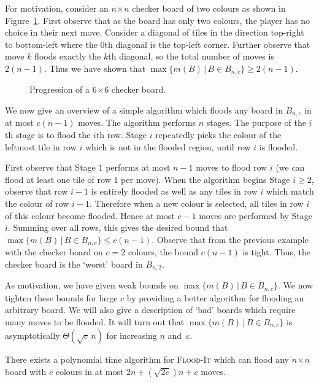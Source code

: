 \documentclass[a4paper,11pt]{llncs}
\newcommand{\pgfgraphic}[1]{}
\newcounter{l}
\renewcommand{\geq}{\geqslant}
\renewcommand{\leq}{\leqslant}
\newcommand{\Floodit}{\textsc{Flood-It}}
\newcommand{\Mnc}{\ensuremath{\max\{m(B)\,|\,B \in B_{n,c}\}}}
\newcommand{\recdim}[2]{$#1$$\mspace{1mu}$$\times$$\mspace{1mu}$$#2$}
\begin{document}
For motivation, consider an \recdim{n}{n} checker board of two colours as shown in Figure~\ref{fig:uplow}. First observe that as the board has only two colours, the player has no choice in their next move. Consider a diagonal of tiles in the direction top-right to bottom-left where the 0th diagonal is the top-left corner. Further observe that move $k$ floods exactly the $k$th diagonal, so the total number of moves is $2(n-1)$. Thus we have shown that $\Mnc \geq 2(n-1)$.

\begin{figure}[t]
\centering
	\pgfgraphic{graphic-checker}
\caption{Progression of a \recdim{6}{6} checker board. }
\label{fig:uplow}
\end{figure}

We now give an overview of a simple algorithm which floods any board in $B_{n,c}$ in at most $c(n-1)$ moves. The algorithm performs $n$ stages. The purpose of the $i$th stage is to flood the $i$th row.  Stage $i$ repeatedly picks the colour of the leftmost tile in row $i$ which is not in the flooded region, until row $i$ is flooded.

First observe that Stage $1$ performs at most $n-1$ moves to flood row $i$ (we can flood at least one tile of row $1$ per move). When the algorithm begins Stage $i\geq 2$, observe that row $i-1$ is entirely flooded as well as any tiles in row $i$ which match the colour of row $i-1$. Therefore when a new colour is selected, all tiles in row $i$ of this colour become flooded. Hence at most $c-1$ moves are performed by Stage $i$. Summing over all rows, this gives the desired bound that $\Mnc \leq c(n-1)$. Observe that from the previous example with the checker board on $c=2$ colours, the bound $c(n-1)$ is tight. Thus, the checker board is the `worst' board in $B_{n,2}$.

As motivation, we have given weak bounds on \Mnc{}. We now tighten these bounds for large $c$ by providing a better algorithm for flooding an arbitrary board. We will also give a description of `bad' boards which require many moves to be flooded. It will turn out that \Mnc{} is asymptotically $\Theta(\sqrt{c}\,n)$ for increasing $n$ and~$c$.

\newcommand{\rem}{\text{rem}}
\begin{theorem} \label{thm:good}
There exists a polynomial time algorithm for \Floodit{} which can flood any \recdim{n}{n} board with $c$ colours in at most $2n+(\sqrt{2c})n+c$ moves.
\end{theorem}
\end{document}
